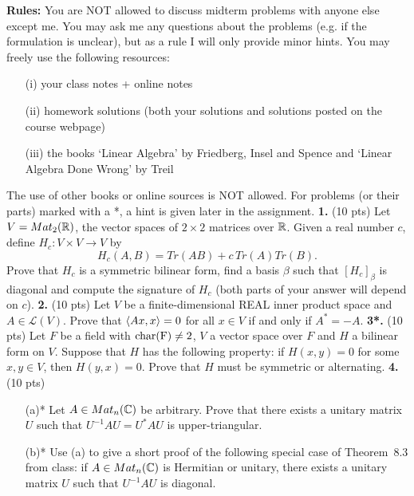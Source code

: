 \documentclass[12pt]{amsart}
\begin{document}
{\bf Rules: } You are NOT allowed to discuss midterm problems with anyone else except me.
You may ask me any questions about the problems (e.g. if the formulation is unclear),
but as a rule I will only provide minor hints. You may freely use the following resources:
\begin{itemize}
\item[(i)] your class notes + online notes 
\item[(ii)] homework solutions (both your solutions and solutions posted on the course webpage)
\item[(iii)]the books `Linear Algebra' by Friedberg, Insel and Spence and `Linear Algebra Done Wrong' by Treil
\end{itemize}
The use of other books or online sources is NOT allowed.
\skv
For problems (or their parts) marked with a *, a hint is given later in the assignment. 
\skv
\skv
{\bf 1.} (10 pts) Let $V=Mat_2({\mathbb R})$, the vector spaces of $2\times 2$ matrices over ${\mathbb R}$. 
Given a real number $c$, define $H_c:V\times V\to V$ by $$H_c(A,B)=Tr(AB)+c\, Tr(A)Tr(B).$$ Prove that $H_c$ is a symmetric bilinear form, find a basis $\beta$ such that $[H_c]_{\beta}$ is diagonal and compute the signature of $H_c$ (both parts of your answer will depend on $c$).
\skv
{\bf 2.} (10 pts) Let $V$ be a finite-dimensional REAL inner product space and $A\in\mathcal L(V)$. Prove that
${\langle} Ax,x{\rangle}=0$ for all $x\in V$ if and only if $A^*=-A$.
\skv
{\bf 3*.} (10 pts) Let $F$ be a field with $\rm char (F)\neq 2$, $V$ a vector space over $F$ and $H$ a bilinear form on $V$.
Suppose that $H$ has the following property: if $H(x,y)=0$ for some $x,y\in V$, then $H(y,x)=0$. Prove that $H$ must be
symmetric or alternating. 
\skv
{\bf 4.} (10 pts)  
\begin{itemize}
\item[(a)*] Let $A\in Mat_n({\mathbb C})$ be arbitrary. Prove that there exists a unitary matrix $U$ such that $U^{-1}AU=U^* AU$ is upper-triangular.
\item[(b)*] Use (a) to give a short proof of the following special case of Theorem~8.3 from class: if $A\in Mat_n({\mathbb C})$ is
Hermitian or unitary, there exists a unitary matrix $U$ such that $U^{-1}AU$ is diagonal.
\end{itemize}
\end{document}
